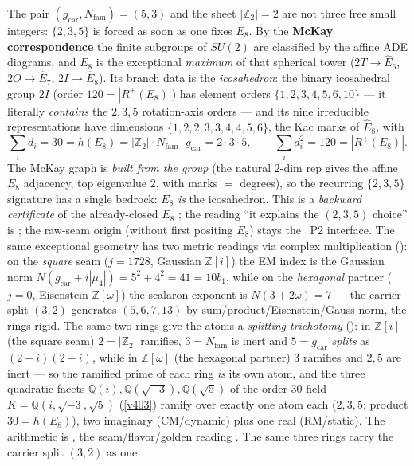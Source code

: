 \documentclass[11pt,a4paper]{article}
\newcommand{\gcar}{g_{\mathrm{car}}}
\newcommand{\Nfam}{N_{\mathrm{fam}}}
\newcommand{\Z}{\mathbb Z}
\begin{document}
\begin{keybox}
The pair $(\gcar,\Nfam)=(5,3)$ and the sheet $|\Z_2|=2$ are not three free small integers: $\{2,3,5\}$ is
forced as soon as one fixes $E_8$. By the \textbf{McKay correspondence} the finite subgroups of $SU(2)$ are
classified by the affine ADE diagrams, and $E_8$ is the exceptional \emph{maximum} of that spherical tower
($2T{\to}\hat E_6$, $2O{\to}\hat E_7$, $2I{\to}\hat E_8$). Its branch data is the \emph{icosahedron}: the
binary icosahedral group $2I$ (order $120{=}|R^+(E_8)|$) has element orders $\{1,2,3,4,5,6,10\}$ --- it
literally \emph{contains} the $2,3,5$ rotation-axis orders --- and its nine irreducible representations have
dimensions $\{1,2,2,3,3,4,4,5,6\}$, the Kac marks of $\hat E_8$, with
\[
  \sum_i d_i = 30 = h(E_8) = |\Z_2|\cdot\Nfam\cdot\gcar = 2\cdot3\cdot5,\qquad
  \sum_i d_i^2 = 120 = |R^+(E_8)| .
\]
The McKay graph is \emph{built from the group} (the natural $2$-dim rep gives the affine $E_8$ adjacency,
top eigenvalue $2$, with marks $=$ degrees), so the recurring $\{2,3,5\}$ signature has a single bedrock:
$E_8$ \emph{is} the icosahedron. This is a \emph{backward certificate} of the already-closed $E_8$ \mE; the
reading ``it explains the $(2,3,5)$ choice'' is \mC; the raw-seam origin (without first positing $E_8$) stays
the \mO\ P2 interface. The same exceptional geometry has two metric readings via complex multiplication
(): on the \emph{square} seam ($j{=}1728$, Gaussian $\Z[i]$) the EM index is
the Gaussian norm $N(\gcar{+}i|\mu_4|)=5^2{+}4^2=41=10b_1$, while on the \emph{hexagonal} partner ($j{=}0$,
Eisenstein $\Z[\omega]$) the scalaron exponent is $N(3{+}2\omega)=7$ --- the carrier split $(3,2)$ generates
$(5,6,7,13)$ by sum/product/Eisenstein/Gauss norm, the rings rigid. The same two rings give the atoms a
\emph{splitting trichotomy} (): in $\Z[i]$ (the square seam) $2{=}|\Z_2|$
ramifies, $3{=}\Nfam$ is inert and $5{=}\gcar$ \emph{splits} as $(2{+}i)(2{-}i)$, while in $\Z[\omega]$ (the
hexagonal partner) $3$ ramifies and $2,5$ are inert --- so the ramified prime of each ring \emph{is} its own
atom, and the three quadratic facets $\mathbb Q(i),\mathbb Q(\sqrt{-3}),\mathbb Q(\sqrt5)$ of the order-$30$
field $K=\mathbb Q(i,\sqrt{-3},\sqrt5)$ (\vref{v403}) ramify over exactly one atom each ($2,3,5$; product
$30=h(E_8)$), two imaginary (CM/dynamic) plus one real (RM/static). The arithmetic is \mE, the
seam/flavor/golden reading \mC. The same three rings carry the carrier split $(3,2)$ as one

\end{keybox}
\end{document}
